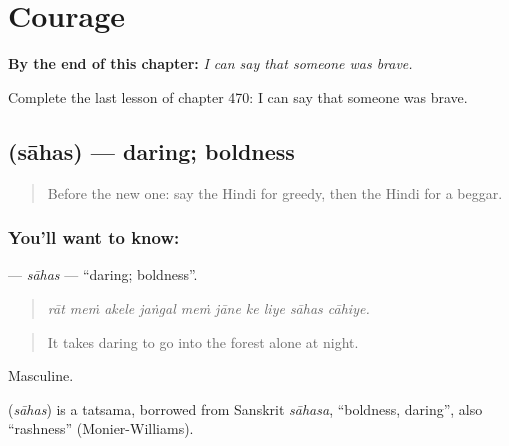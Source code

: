 
\chapter{Courage}
\label{ch:hi-courage}

\begin{chapteropening}
\textbf{By the end of this chapter:} \emph{I can say that someone was brave.}

Complete the last lesson of chapter 470: I can say that someone was brave.
\end{chapteropening}

\section[\texorpdfstring{\hi{साहस} (sāhas)}{साहस (sāhas)}]{ (sāhas) — daring; boldness}

\label{lesson:HI-C470-sahas}



\begin{quote}
Before the new one: say the Hindi for greedy, then the Hindi for a beggar.
\end{quote}

\subsection*{You'll want to know: }
\textbf{} — \emph{sāhas} — \textquotedblleft{}daring; boldness\textquotedblright{}.

\begin{quote}
         
\end{quote}

\begin{quote}
\emph{rāt meṁ akele jaṅgal meṁ jāne ke liye sāhas cāhiye.}
\end{quote}

\begin{quote}
It takes daring to go into the forest alone at night.
\end{quote}

Masculine.

\begin{cousinweb}
\textbf{} (\emph{sāhas}) is a tatsama, borrowed from Sanskrit \emph{sāhasa}, \textquotedblleft{}boldness, daring\textquotedblright{}, also \textquotedblleft{}rashness\textquotedblright{} (Monier-Williams).
\end{cousinweb}

